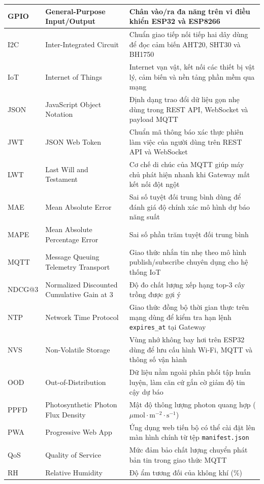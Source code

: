 \begin{small}
\begin{longtable}{|p{2.0cm}|p{5.5cm}|p{6.2cm}|}
GPIO & General-Purpose Input/Output & Chân vào/ra đa năng trên vi điều khiển ESP32 và ESP8266 \\ \hline
I2C & Inter-Integrated Circuit & Chuẩn giao tiếp nối tiếp hai dây dùng để đọc cảm biến AHT20, SHT30 và BH1750 \\ \hline
IoT & Internet of Things & Internet vạn vật, kết nối các thiết bị vật lý, cảm biến và nền tảng phần mềm qua mạng \\ \hline
JSON & JavaScript Object Notation & Định dạng trao đổi dữ liệu gọn nhẹ dùng trong REST API, WebSocket và payload MQTT \\ \hline
JWT & JSON Web Token & Chuẩn mã thông báo xác thực phiên làm việc của người dùng trên REST API và WebSocket \\ \hline
LWT & Last Will and Testament & Cơ chế di chúc của MQTT giúp máy chủ phát hiện nhanh khi Gateway mất kết nối đột ngột \\ \hline
MAE & Mean Absolute Error & Sai số tuyệt đối trung bình dùng để đánh giá độ chính xác mô hình dự báo năng suất \\ \hline
MAPE & Mean Absolute Percentage Error & Sai số phần trăm tuyệt đối trung bình \\ \hline
MQTT & Message Queuing Telemetry Transport & Giao thức nhắn tin nhẹ theo mô hình publish/subscribe chuyên dụng cho hệ thống IoT \\ \hline
NDCG@3 & Normalized Discounted Cumulative Gain at 3 & Độ đo chất lượng xếp hạng top-3 cây trồng được gợi ý \\ \hline
NTP & Network Time Protocol & Giao thức đồng bộ thời gian thực trên mạng dùng để kiểm tra hạn lệnh \texttt{expires\_at} tại Gateway \\ \hline
NVS & Non-Volatile Storage & Vùng nhớ không bay hơi trên ESP32 dùng để lưu cấu hình Wi-Fi, MQTT và thông số vận hành \\ \hline
OOD & Out-of-Distribution & Dữ liệu nằm ngoài phân phối tập huấn luyện, làm căn cứ gắn cờ giảm độ tin cậy dự báo \\ \hline
PPFD & Photosynthetic Photon Flux Density & Mật độ thông lượng photon quang hợp (\(\mu\text{mol}\cdot\text{m}^{-2}\cdot\text{s}^{-1}\)) \\ \hline
PWA & Progressive Web App & Ứng dụng web tiến bộ có thể cài đặt lên màn hình chính từ tệp \texttt{manifest.json} \\ \hline
QoS & Quality of Service & Mức đảm bảo chất lượng chuyển phát bản tin trong giao thức MQTT \\ \hline
RH & Relative Humidity & Độ ẩm tương đối của không khí (\%) \\ \hline

\end{longtable}
\end{small}
